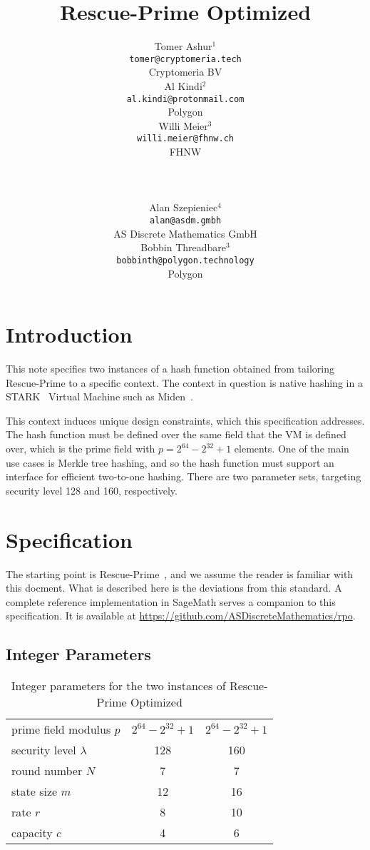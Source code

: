 \documentclass[a4paper]{article}
\title{Rescue-Prime Optimized}
\author{
\begin{tabular}{c}Tomer Ashur$^1$ \\ \small \texttt{tomer@cryptomeria.tech} \\ \small Cryptomeria BV \end{tabular}
\begin{tabular}{c}Al Kindi$^2$ \\ \small \texttt{al.kindi@protonmail.com} \\ \small Polygon \end{tabular}
\begin{tabular}{c}Willi Meier$^3$ \\ \small \texttt{willi.meier@fhnw.ch} \\ \small FHNW \end{tabular} \\ \\
\begin{tabular}{c}Alan Szepieniec$^4$ \\ \small \texttt{alan@asdm.gmbh} \\ \small AS Discrete Mathematics GmbH \end{tabular}
\begin{tabular}{c}Bobbin Threadbare$^3$ \\ \small \texttt{bobbinth@polygon.technology} \\ \small Polygon \end{tabular} 
}
\begin{document}
\maketitle

\section{Introduction}
\label{section:intro}

This note specifies two instances of a hash function obtained from tailoring Rescue-Prime to a specific context. The context in question is native hashing in a STARK~\cite{cryptoeprint:2018/046} Virtual Machine such as Miden~\cite{miden}.

This context induces unique design constraints, which this specification addresses. The hash function must be defined over the same field that the VM is defined over, which is the prime field with  $p = 2^{64} - 2^{32} + 1$ elements. One of the main use cases is Merkle tree hashing, and so the hash function must support an interface for efficient two-to-one hashing. There are two parameter sets, targeting security level 128 and 160, respectively. 

\section{Specification}

The starting point is Rescue-Prime~\cite{cryptoeprint:2020/1143}, and we assume the reader is familiar with this docment. What is described here is the deviations from this standard. A complete reference implementation in SageMath serves a companion to this specification. It is available at \url{https://github.com/ASDiscreteMathematics/rpo}.

\subsection{Integer Parameters}

\begin{table}[!htp]
\centering
\caption{Integer parameters for the two instances of Rescue-Prime Optimized}
\label{table:integer-parameters}

\begin{tabular}{l||c|c}
prime field modulus $p$ & $2^{64} - 2^{32} + 1$ & $2^{64} - 2^{32} + 1$ \\
security level $\lambda$ & 128 & 160 \\
round number $N$ & 7 & 7 \\
state size $m$ & 12 & 16 \\
rate $r$ & 8 & 10 \\
capacity $c$ & 4 & 6 \\
\end{tabular}
\end{table}
\end{document}

